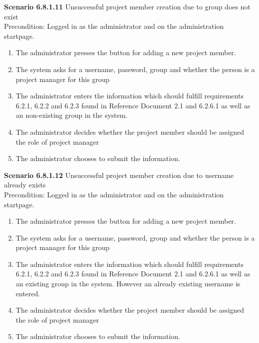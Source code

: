 \documentclass{article}
\begin{document}
\noindent\textbf{Scenario 6.8.1.11} Unsuccessful project member creation due to group does not exist  \\
Precondition: Logged in as the administrator and on the administration startpage.
\begin{enumerate}
\item The administrator presses the button for adding a new project member.
\item The system asks for a username, password, group and whether the person is a project manager for this group
\item The administrator enters the information which should fulfill requirements 6.2.1, 6.2.2 and 6.2.3 found in Reference Document 2.1 and 6.2.6.1 as well as an non-existing group in the system.
\item The administrator decides whether the project member should be assigned the role of project manager
\item The administrator chooses to submit the information.
\end{enumerate}

\noindent\textbf{Scenario 6.8.1.12} Unsuccessful project member creation due to username already exists  \\
Precondition: Logged in as the administrator and on the administration startpage.
\begin{enumerate}
\item The administrator presses the button for adding a new project member.
\item The system asks for a username, password, group and whether the person is a project manager for this group
\item The administrator enters the information which should fulfill requirements 6.2.1, 6.2.2 and 6.2.3 found in Reference Document 2.1 and 6.2.6.1 as well as an existing group in the system. However an already existing username is entered.
\item The administrator decides whether the project member should be assigned the role of project manager
\item The administrator chooses to submit the information.
\end{enumerate}
\end{document}
